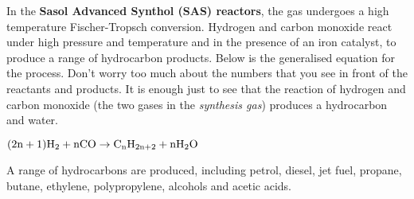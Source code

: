 \begin{enumerate}
In the \textbf{Sasol Advanced Synthol (SAS) reactors}, the gas undergoes a high temperature Fischer-Tropsch conversion. Hydrogen and carbon monoxide react under high pressure and temperature and in the presence of an iron catalyst, to produce a range of hydrocarbon products. Below is the generalised equation for the process. Don't worry too much about the numbers that you see in front of the reactants and products. It is enough just to see that the reaction of hydrogen and carbon monoxide (the two gases in the \textit{synthesis gas}) produces a hydrocarbon and water. 

\begin{center}
$\rm{(2n+1)H_{2} + nCO \rightarrow C_{n}H_{2n+2} + nH_{2}O}$\\
\end{center}

A range of hydrocarbons are produced, including petrol, diesel, jet fuel, propane, butane, ethylene, polypropylene, alcohols and acetic acids.

\end{enumerate}
